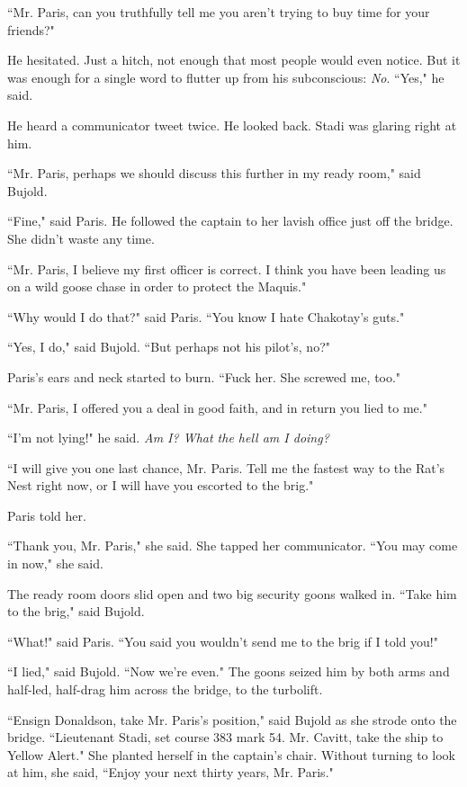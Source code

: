 \documentclass[twoside,letterpaper,12pt]{memoir}
\begin{document}
``Mr. Paris, can you truthfully tell me you aren't trying to buy time for your friends?"

He hesitated. Just a hitch, not enough that most people would even notice. But it was enough for a single word to flutter up from his subconscious: \textit{No}. ``Yes," he said.

He heard a communicator tweet twice. He looked back. Stadi was glaring right at him.

``Mr. Paris, perhaps we should discuss this further in my ready room," said Bujold.

``Fine," said Paris. He followed the captain to her lavish office just off the bridge. She didn't waste any time.

``Mr. Paris, I believe my first officer is correct. I think you have been leading us on a wild goose chase in order to protect the Maquis."

``Why would I do that?" said Paris. ``You know I hate Chakotay's guts."

``Yes, I do," said Bujold. ``But perhaps not his pilot's, no?"

Paris's ears and neck started to burn. ``Fuck her. She screwed me, too."

``Mr. Paris, I offered you a deal in good faith, and in return you lied to me."

``I'm not lying!" he said. \textit{Am I? What the hell am I doing?}

``I will give you one last chance, Mr. Paris. Tell me the fastest way to the Rat's Nest right now, or I will have you escorted to the brig."

Paris told her.

``Thank you, Mr. Paris," she said. She tapped her communicator. ``You may come in now," she said.

The ready room doors slid open and two big security goons walked in. ``Take him to the brig," said Bujold.

``What!" said Paris. ``You said you wouldn't send me to the brig if I told you!"

``I lied," said Bujold. ``Now we're even." The goons seized him by both arms and half-led, half-drag him across the bridge, to the turbolift.

``Ensign Donaldson, take Mr. Paris's position," said Bujold as she strode onto the bridge. ``Lieutenant Stadi, set course 383 mark 54. Mr. Cavitt, take the ship to Yellow Alert." She planted herself in the captain's chair. Without turning to look at him, she said, ``Enjoy your next thirty years, Mr. Paris."
\end{document}
